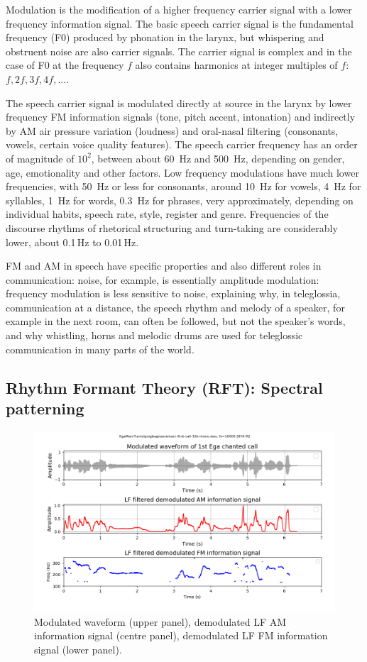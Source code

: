 \documentclass[output=paper,colorlinks,citecolor=brown]{langscibook}
\begin{document}
Modulation is the modification of a higher frequency carrier signal with a lower frequency information signal. The basic speech carrier signal is the fundamental frequency (F0) produced by phonation in the larynx, but whispering and obstruent noise are also carrier signals. The carrier signal is complex and in the case of F0 at the frequency $f$ also contains harmonics at integer multiples of $f$: $f, 2f, 3f, 4f,  ... $.

The speech carrier signal is modulated directly at source in the larynx by lower frequency FM information signals (tone, pitch accent, intonation) and indirectly by AM air pressure variation (loudness) and oral-nasal filtering (consonants, vowels, certain voice quality features). The speech carrier frequency has an order of magnitude of $10^2$, between about 60~Hz and 500~Hz, depending on gender, age, emotionality and other factors. Low frequency modulations have much lower frequencies, with 50~Hz or less for consonants, around 10~Hz for vowels, 4~Hz for syllables, 1~Hz for words, 0.3~Hz for phrases, very approximately, depending on individual habits, speech rate, style, register and genre. Frequencies of the discourse rhythms of rhetorical structuring and turn-taking are considerably lower, about 0.1\,Hz to 0.01\,Hz.

FM and AM in speech have specific properties and also different roles in communication: noise, for example, is essentially amplitude modulation: frequency modulation is less sensitive to noise, explaining why, in teleglossia, communication at a distance, the speech rhythm and melody of a speaker, for example in the next room, can often be followed, but not the speaker's words, and why whistling, horns and melodic drums are used for teleglossic communication in many parts of the world.

\subsection{Rhythm Formant Theory (RFT): Spectral patterning}

\begin{figure}
\includegraphics[trim={1.5cm 1.5cm 0 0}, clip, width=\textwidth]{gibbon_figure05.png}
\caption{\label{fig:fig05}Modulated waveform (upper panel), demodulated LF AM information signal (centre panel), demodulated LF FM information signal (lower panel).}
\end{figure}
\end{document}
